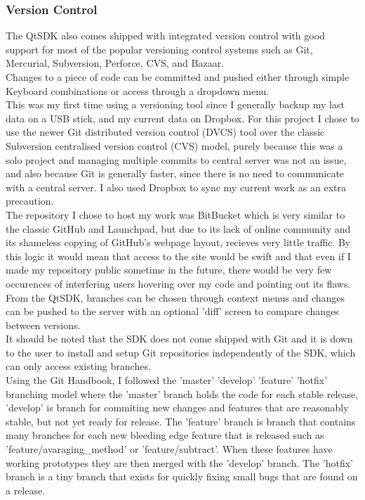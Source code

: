 \subsubsection{Version Control}
The QtSDK also comes shipped with integrated version control with good support for most of the popular versioning control systems such as Git, Mercurial, Subversion, Perforce, CVS, and Bazaar.\\
Changes to a piece of code can be committed and pushed either through simple Keyboard combinations or access through a dropdown menu.\\
This was my first time using a versioning tool since I generally backup my last data on a USB stick, and my current data on Dropbox.
For this project I chose to use the newer Git distributed version control (DVCS) tool over the classic Subversion centralised version control (CVS) model, purely because this was a solo project and managing multiple commits to central server was not an issue, and also because Git is generally faster, since there is no need to communicate with a central server. I also used Dropbox to sync my current work as an extra precaution.\\
The repository I chose to host my work was BitBucket which is very similar to the classic GitHub and Launchpad, but due to its lack of online community and its shameless copying of GitHub's webpage layout, recieves very little traffic\cite{gitvs}. By this logic it would mean that access to the site would be swift and that even if I made my repository public sometime in the future, there would be very few occurences of interfering users hovering over my code and pointing out its flaws.
From the QtSDK, branches can be chosen through context menus and changes can be pushed to the server with an optional 'diff' screen to compare changes between versions.\\It should be noted that the SDK does not come shipped with Git and it is down to the user to install and setup Git repositories independently of the SDK, which can only access existing branches.\\Using the Git Handbook, I followed the 'master' 'develop' 'feature' 'hotfix' branching model where the 'master' branch holds the code for each stable release, 'develop' is branch for commiting new changes and features that are reasonably stable, but not yet ready for release. The 'feature' branch is branch that contains many branches for each new bleeding edge feature that is released  such as 'feature/avaraging\_method' or 'feature/subtract'. When these features have working prototypes they are then merged with the 'develop' branch. The 'hotfix' branch is a tiny branch that exists for quickly fixing small bugs that are found on a release.
